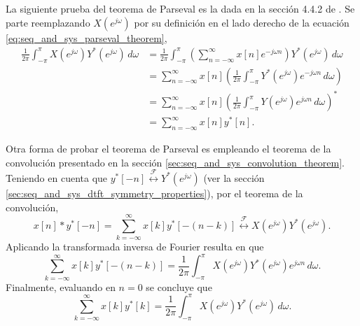 \documentclass[a4paper]{report}
\begin{document}
La siguiente prueba del teorema de Parseval es la dada en la sección 4.4.2 de \cite{proakis06digital}. Se parte reemplazando \(X(e^{j\omega})\) por su definición en el lado derecho de la ecuación \ref{eq:seq_and_sys_parseval_theorem},
\begin{align*}
 \frac{1}{2\pi}\int_{-\pi}^{\pi}X(e^{j\omega})Y^*(e^{j\omega})\,d\omega&=\frac{1}{2\pi}\int_{-\pi}^{\pi}\left(\sum_{n=-\infty}^\infty x[n]e^{-j\omega n}\right)Y^*(e^{j\omega})\,d\omega\\
  &=\sum_{n=-\infty}^\infty x[n]\left(\frac{1}{2\pi}\int_{-\pi}^{\pi}Y^*(e^{j\omega})e^{-j\omega n}\,d\omega\right)\\
  &=\sum_{n=-\infty}^\infty x[n]\left(\frac{1}{2\pi}\int_{-\pi}^{\pi}Y(e^{j\omega})e^{j\omega n}\,d\omega\right)^*\\
  &=\sum_{n=-\infty}^\infty x[n]y^*[n].
\end{align*}

Otra forma de probar el teorema de Parseval es empleando el teorema de la convolución presentado en la sección \ref{sec:seq_and_sys_convolution_theorem}. Teniendo en cuenta que \(y^*[-n]\overset{\mathcal{F}}{\longleftrightarrow}Y^*(e^{j\omega})\) (ver la sección \ref{sec:seq_and_sys_dtft_symmetry_properties}), por el teorema de la convolución,
\[
 x[n]*y^*[-n]=\sum_{k=-\infty}^{\infty}x[k]y^*[-(n-k)]\overset{\mathcal{F}}{\longleftrightarrow}X(e^{j\omega})Y^*(e^{j\omega}).
\]
Aplicando la transformada inversa de Fourier resulta en que
\[
 \sum_{k=-\infty}^{\infty}x[k]y^*[-(n-k)]=\frac{1}{2\pi}\int_{-\pi}^{\pi}X(e^{j\omega})Y^*(e^{j\omega})e^{j\omega n}\,d\omega.
\]
Finalmente, evaluando en \(n=0\) se concluye que
\[
 \sum_{k=-\infty}^{\infty}x[k]y^*[k]=\frac{1}{2\pi}\int_{-\pi}^{\pi}X(e^{j\omega})Y^*(e^{j\omega})\,d\omega.
\]
\end{document}
